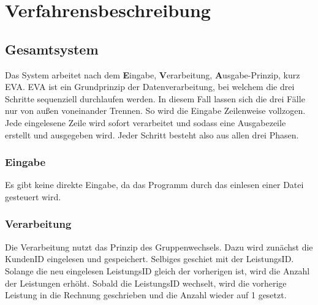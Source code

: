 \chapter{Verfahrensbeschreibung}\label{ch:verfahrensbeschreibung}


\section{Gesamtsystem}\label{sec:gesamtsystem}
Das System arbeitet nach dem \textbf{E}ingabe, \textbf{V}erarbeitung, \textbf{A}usgabe-Prinzip, kurz EVA.
EVA ist ein Grundprinzip der Datenverarbeitung, bei welchem die drei Schritte sequenziell durchlaufen werden.
In diesem Fall lassen sich die drei Fälle nur von außen voneinander Trennen. So wird die Eingabe Zeilenweise vollzogen. Jede eingelesene Zeile wird sofort verarbeitet und sodass eine Ausgabezeile erstellt und ausgegeben wird. Jeder Schritt besteht also aus allen drei Phasen.\\

\subsection{Eingabe}\label{subsec:eingabe}
Es gibt keine direkte Eingabe, da das Programm durch das einlesen einer Datei gesteuert wird.

\subsection{Verarbeitung}\label{subsec:verarbeitung}
Die Verarbeitung nutzt das Prinzip des Gruppenwechsels. Dazu wird zunächst die KundenID eingelesen und gespeichert. Selbiges geschiet mit der LeistungsID. Solange die neu eingelesen LeistungsID gleich der vorherigen ist, wird die Anzahl der Leistungen erhöht. Sobald die LeistungsID wechselt, wird die vorherige Leistung in die Rechnung geschrieben und die Anzahl wieder auf 1 gesetzt.\\



